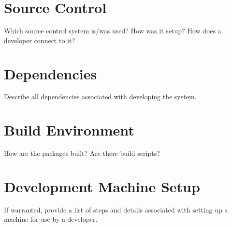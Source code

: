 \section{Source  Control}
Which source control system is/was used?  How was it setup?  How does a developer 
connect to it? 

\section{Dependencies}
Describe all dependencies associated with developing the system. 

\section{Build  Environment}
How are the packages built?  Are there build scripts? 

\section{Development Machine Setup}
If warranted, provide a list of steps and details associated with setting up a 
machine for use by a developer. 


